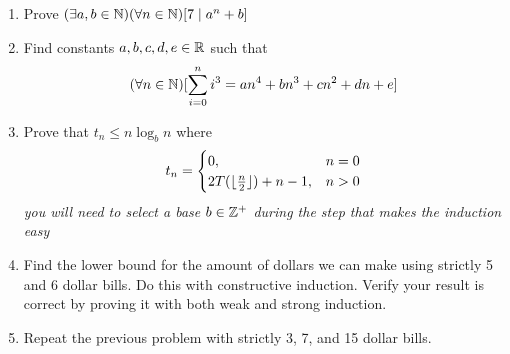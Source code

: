 \documentclass[main.tex]{subfiles}
\begin{document}
\begin{enumerate}
	\item Prove \((\exists a,b \in \mathbb{N})(\forall n \in \mathbb{N})[7 \mid a^n + b]\)
	\item Find constants \(a,b,c,d,e \in \mathbb{R}\) such that \[(\forall n \in \mathbb{N})[\sum_{i=0}^{n} i^3 = an^4 + bn^3 + cn^2 + dn + e]\]
	\item Prove that \(t_n \leq n \log_b n\) where \[t_n = \begin{cases} 0, & n = 0 \\ 2T(\lfloor\frac{n}{2}\rfloor) + n - 1, & n > 0 \end{cases}\] \textit{you will need to select a base \(b \in \mathbb{Z}^+\) during the step that makes the induction easy}
	\item Find the lower bound for the amount of dollars we can make using strictly 5 and 6 dollar bills. Do this with constructive induction. Verify your result is correct by proving it with both weak and strong induction. %
	\item Repeat the previous problem with strictly 3, 7, and 15 dollar bills.
\end{enumerate}

%
\end{document}
